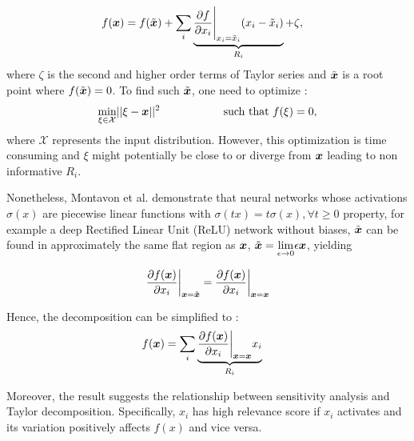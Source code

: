 \begin{align*}
	f(\patvector{x}) 	&= f(\tilde{\patvector{x}}) + \sum_{i} \underbrace{\frac{\partial f }{ \partial x_i } \Bigg|_{x_i = \tilde{x}_i}  ( x_i - \tilde{x}_i ) }_{R_i} + \zeta, 
\end{align*}
where $\zeta$ is the second and higher order terms of Taylor series and $\tilde{\patvector{x}}$ is a root point where $f(\tilde{\patvector{x}}) = 0 $.  To find such  $\tilde{\patvector{x}}$, one need to optimize :
$$
\underset{\xi \in \mathcal{X} }{\text{min}}  || \xi - \patvector{x} ||^2 \hspace{2cm}  \text{such that}\  f(\xi) = 0,
$$
where $\mathcal{X}$ represents the input distribution. However, this optimization is time consuming  and $\xi$ might potentially be close to or diverge from $\patvector{x}$ leading to non informative $R_i$.

Nonetheless, Montavon et al.\cite{MontavonMethodsInterpretingUnderstanding2017} demonstrate that  neural networks whose activations $\sigma(x)$ are piecewise linear functions  with $\sigma(tx) = t\sigma(x) ,\forall t \ge 0$ property, for example a deep Rectified Linear Unit (ReLU) network without biases, $\tilde{\patvector{x}}$ can be found in  approximately the same flat region as $\patvector{x}$, $\tilde{\patvector{x}} = \underset{\epsilon \rightarrow 0 }{\lim} \epsilon \patvector{x}$, yielding

 $$\frac{\partial f(\patvector{x})}{\partial x_i}\bigg|_{\patvector{x}={\tilde{\patvector{x}}}} = \frac{\partial f(\patvector{x})}{\partial x_i}\bigg|_{\patvector{x}={\patvector{x}}} $$

Hence, the decomposition can be simplified to :
\begin{align*}
	f(\patvector{x}) &= \sum_{i} \underbrace{\frac{\partial f(\patvector{x})}{\partial x_i}\bigg|_{\patvector{x}={\patvector{x}}}  x_i}_{ R_i } 
\end{align*} 

Moreover, the result suggests the relationship between sensitivity analysis and Taylor decomposition. Specifically, $x_i$ has high relevance score if $x_i$ activates and its variation positively affects $f(x)$ and vice versa.




